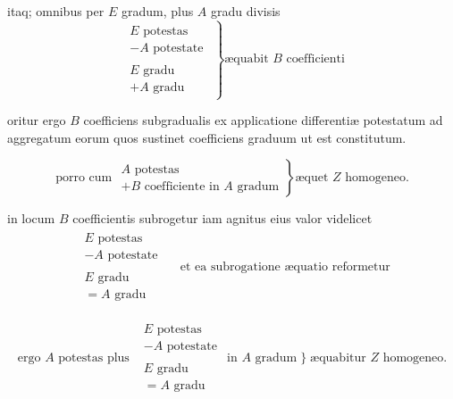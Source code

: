 \documentclass[11pt,a4paper]{article}
\begin{document}
itaq; omnibus per $E$ gradum, plus $A$ gradu divisis
\[ \left.\begin{array}{c} \begin{array}{l} E \text{ potestas} \\ - A \text{ potestate} \end{array} \\ \hline \begin{array}{l} E \text{ gradu} \\ + A \text{ gradu} \end{array} \end{array}\right\} \text{æquabit } B \text{ coefficienti} \]

oritur ergo $B$ coefficiens subgradualis ex applicatione differentiæ potestatum ad aggregatum eorum quos sustinet coefficiens graduum ut est constitutum.

\[ \text{porro cum } \left.\begin{array}{l} A \text{ potestas} \\ + B \text{ coefficiente in } A \text{ gradum} \end{array}\right\} \text{æquet } Z \text{ homogeneo.} \]

in locum $B$ coefficientis subrogetur iam agnitus eius valor videlicet
\[ \begin{array}{c} \begin{array}{l} E \text{ potestas} \\ - A \text{ potestate} \end{array} \\ \hline \begin{array}{l} E \text{ gradu} \\ = A \text{ gradu} \end{array} \end{array} \quad \text{et ea subrogatione æquatio reformetur} \]

\[ \text{ergo } A \text{ potestas plus } \begin{array}{c} \begin{array}{l} E \text{ potestas} \\ - A \text{ potestate} \end{array} \\ \hline \begin{array}{l} E \text{ gradu} \\ = A \text{ gradu} \end{array} \end{array} \text{in } A \text{ gradum} \;\Big\}\; \text{æquabitur } Z \text{ homogeneo.} \]
\end{document}
